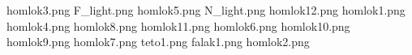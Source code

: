 homlok3.png
F_light.png
homlok5.png
N_light.png
homlok12.png
homlok1.png
homlok4.png
homlok8.png
homlok11.png
homlok6.png
homlok10.png
homlok9.png
homlok7.png
teto1.png
falak1.png
homlok2.png
